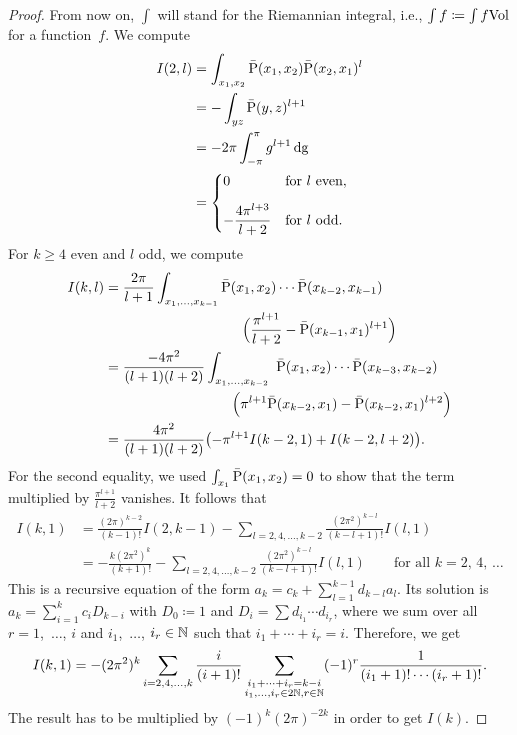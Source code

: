 \documentclass[\MainFolder/Text.tex]{subfiles}
\begin{document}
\begin{proof}
From now on, $\int$ will stand for the Riemannian integral, i.e., $\int f \coloneqq \int f\mathrm{Vol}$ for a function~$f$. We compute
%
\begin{align*}
I(2,l) &= \int_{x_1, x_2} \bar{\mathrm{P}}(x_1,x_2)\bar{\mathrm{P}}(x_2,x_1)^{l} \\
 &= - \int_{y z} \bar{\mathrm{P}}(y,z)^{l+1} \\
 &=- 2\pi \int_{-\pi}^\pi g^{l+1} \operatorname{dg} \\
 &= \begin{cases} 0 & \text{for }l \text{ even}, \\[2ex] 
 - \dfrac{4 \pi^{l+3}}{l+2} &\text{for }l\text{ odd}. \end{cases}
\end{align*}
For $k\ge 4$ even and $l$ odd, we compute %
\begin{align*}
 I(k,l) &= \begin{multlined}[t]\frac{2\pi}{l+1}\int_{x_1, \dotsc, x_{k-1}}\bar{\Prpg}(x_1,x_2)\dotsm \bar{\Prpg}(x_{k-2},x_{k-1}) \\ \Bigl(\frac{\pi^{l+1}}{l+2} - \bar{\Prpg}(x_{k-1},x_1)^{l+1}\Bigr) \end{multlined} \\ 
&\begin{multlined}
=\frac{-4\pi^2}{(l+1)(l+2)} \int_{x_1, \dotsc, x_{k-2}}\ \bar{\Prpg}(x_1,x_2) \dotsm \bar{\Prpg}(x_{k-3},x_{k-2})\\ \Bigl(\pi^{l+1} \bar{\Prpg}(x_{k-2},x_1)
 -\bar{\Prpg}(x_{k-2},x_1)^{l+2}\Bigr)
\end{multlined} \\
&= \frac{4\pi^2}{(l+1)(l+2)}\bigl(-\pi^{l+1} I(k-2,1)+I(k-2,l+2)\bigr).
\end{align*}
%
For the second equality, we used $\int_{x_1} \bar{\mathrm{P}}(x_1,x_2) = 0$ to show that the term multiplied by $\frac{\pi^{l+1}}{l+2}$ vanishes. It follows that
\begin{align*}
I(k,1) &= \frac{(2\pi)^{k-2}}{(k-1)!} I(2,k-1) - \sum_{l=2, 4, \dotsc, k-2} \frac{(2\pi^2)^{k-l}}{(k-l+1)!} I(l,1) \\ 
&=-\frac{k(2\pi^2)^k}{(k+1)!}-\sum_{l=2, 4, \dotsc, k-2} \frac{(2\pi^2)^{k-l}}{(k-l+1)!} I(l,1)\qquad\text{for all }k=2,\,4,\,\dotsc
\end{align*}
This is a recursive equation of the form $a_k = c_k + \sum_{l=1}^{k-1} d_{k-l} a_l$. Its solution is $a_k = \sum_{i=1}^k c_i D_{k-i}$ with $D_0\coloneqq 1$ and $D_i = \sum d_{i_1} \dotsm d_{i_r}$, where we sum over all $r=1$,~$\dotsc$, $i$ and $i_1$,~$\dotsc$, $i_r\in \mathbb{N}$ such that $i_1+ \dotsb + i_r = i$. Therefore, we get %
\[ I(k,1) = -(2\pi^2)^k \sum_{i=2, 4, \dotsc, k} \frac{i}{(i+1)!} \sum_{\substack{i_1 + \dotsb + i_r = k-i \\ i_1, \dotsc, i_r \in 2\mathbb{N}, r\in \mathbb{N}}} (-1)^r \frac{1}{(i_1+1)! \dotsm (i_r+1)!}.\]
The result has to be multiplied by $(-1)^k(2\pi)^{-2k}$ in order to get $I(k)$. 
\end{proof} %
\end{document}
